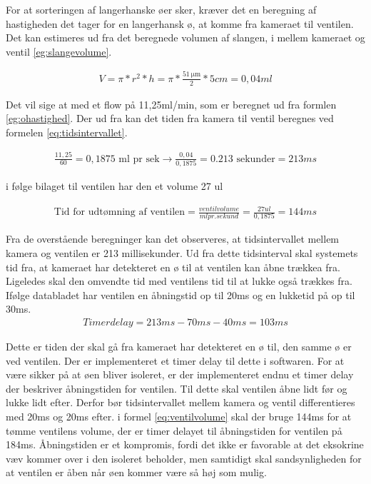 For at sorteringen af langerhanske øer sker, kræver det en beregning af hastigheden det tager for en langerhansk ø, at komme fra kameraet til ventilen. Det kan estimeres ud fra det beregnede volumen af slangen, i mellem kameraet og ventil \ref{eg:slangevolume}.

\begin{align}
V=\pi*r^2*h=\pi*\frac{\SI{51}{\micro\metre}}{2}*5cm=0,04ml
\label{eg:slangevolume}
\end{align}

 Det vil sige at med et flow på 11,25ml/min, som er beregnet ud fra formlen \ref{eg:ohastighed}. Der ud fra kan det tiden fra kamera til ventil beregnes ved formelen \ref{eq:tidsintervallet}. 
 
\begin{align}
\frac{11,25}{60}=0,1875\text{ ml pr sek}\to\frac{0,04}{0,1875}=0.213\text{ sekunder}=213ms
\label{eq:tidsintervallet}
\end{align} 

i følge bilaget til ventilen har den et volume 27 ul

\begin{align}
\text{Tid for udtømning af ventilen} = \frac{ventil volume}{ml pr. sekund}=\frac{27ul}{0,1875}=144ms
\label{eq:ventilvolume}
\end{align}

Fra de overstående beregninger kan det observeres, at tidsintervallet mellem kamera og ventilen er 213 millisekunder. Ud fra dette tidsinterval skal systemets tid fra, at kameraet har detekteret en ø til at ventilen kan åbne trækkea fra. Ligeledes skal den omvendte tid med ventilens tid til at lukke også trækkes fra. Ifølge databladet har ventilen en åbningstid op til 20ms og en lukketid på op til 30ms.
\begin{align}
Timerdelay=213ms-70ms-40ms=103ms
\label{eq:timerdelay}
\end{align} 

Dette er tiden der skal gå fra kameraet har detekteret en ø til, den samme ø er ved ventilen. Der er implementeret et timer delay til dette i softwaren. For at være sikker på at øen bliver isoleret, er der implementeret endnu et timer delay der beskriver åbningstiden for ventilen. Til dette skal ventilen åbne lidt før og lukke lidt efter. Derfor bør tidsintervallet mellem kamera og ventil differentieres med 20ms og 20ms efter. i formel \ref{eq:ventilvolume} skal der bruge 144ms for at tømme ventilens volume, der er timer delayet til åbningstiden for ventilen på 184ms. 
Åbningstiden er et kompromis, fordi det ikke er favorable at det eksokrine væv kommer over i den isoleret beholder, men samtidigt skal sandsynligheden for at ventilen er åben når øen kommer være så høj som mulig.


